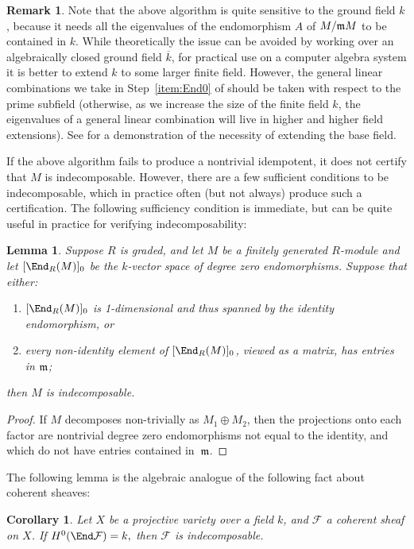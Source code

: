 \documentclass[12pt]{article}
\let\bar\overline
\def\cF{\mathcal F}
\theoremstyle{theorem}
\numberwithin{thm}{section}
\newtheorem{lem}[thm]{Lemma}
\newtheorem{cor}[thm]{Corollary}
\theoremstyle{definition}
\newtheorem{rem}[thm]{Remark}
\begin{document}
\begin{rem}
  Note that the above algorithm is quite sensitive to the ground field $k$, because it needs all the eigenvalues of the endomorphism $A$ of $M/\mathfrak m M$ to be contained in $k$. While theoretically the issue can be avoided by working over an algebraically closed ground field $\bar k$, for practical use on a computer algebra system it is better to extend $k$ to some larger finite field. However, the general linear combinations we take in Step~\ref{item:End0} of  should be taken with respect to the prime subfield (otherwise, as we increase the size of the finite field $k$, the eigenvalues of a general linear combination will live in higher and higher field extensions).
  See  for a demonstration of the necessity of extending the base field.
\end{rem}

If the above algorithm fails to produce a nontrivial idempotent, it does not certify that $M$ is indecomposable. However, there are a few sufficient conditions to be indecomposable, which in practice often (but not always) produce such a certification.
The following sufficiency condition is immediate, but can be quite useful in practice for verifying indecomposability:

\begin{lem}
  Suppose $R$ is graded, and let $M$ be a finitely generated $R$-module and let $[\End_R(M)]_0$ be the $k$-vector space of degree zero endomorphisms. Suppose that either:
  \begin{enumerate}
  \item $[\End_R(M)]_0$ is 1-dimensional and thus spanned by the identity endomorphism, or
  \item every non-identity element of $[\End_R(M)]_0$, viewed as a matrix, has entries in $\mathfrak m$;
  \end{enumerate}
  then $M$ is indecomposable.
\end{lem}

\begin{proof}
  If $M$ decomposes non-trivially as $M_1\oplus M_2$, then the projections onto each factor are nontrivial degree zero endomorphisms not equal to the identity, and which do not have entries contained in~$\mathfrak m$.
\end{proof}

The following lemma is the algebraic analogue of the following fact about coherent sheaves:

\begin{cor}
  Let $X$ be a projective variety over a field $k$, and $\cF$ a coherent sheaf on $X$.
  If $ H^0(\End \cF) = k, $ then $\cF$ is indecomposable.
\end{cor}
\end{document}

